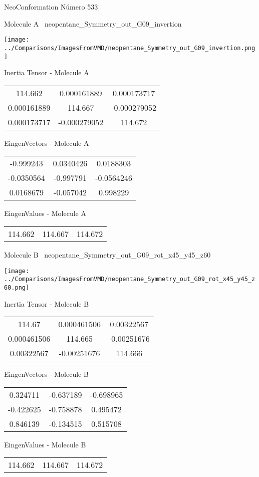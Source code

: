 \vtab[-3cm]
\begin{center}
{\large NeoConformation \tab Número 533}
\end{center}
\begin{multicols}{2}
\begin{center}

Molecule A \
neopentane\_Symmetry\_out\_G09\_invertion

\texttt{[image: ../Comparisons/ImagesFromVMD/neopentane\_Symmetry\_out\_G09\_invertion.png]}

Inertia Tensor - Molecule A \\
\begin{tabular}{|c c c|}
114.662	 & 	0.000161889	 & 	0.000173717	 \\
0.000161889	 & 	114.667	 & 	-0.000279052	 \\
0.000173717	 & 	-0.000279052	 & 	114.672
\end{tabular}

\vtab
 EingenVectors - Molecule A     \\
\begin{tabular}{|c c c|}
-0.999243	 & 	0.0340426	 & 	0.0188303	 \\
-0.0350564	 & 	-0.997791	 & 	-0.0564246	 \\
0.0168679	 & 	-0.057042	 & 	0.998229
\end{tabular}

\vtab
 EingenValues - Molecule A     \\
\begin{tabular}{|c c c|}
114.662	 & 	114.667	 & 	114.672	 \\
\end{tabular}
\columnbreak

Molecule B \
neopentane\_Symmetry\_out\_G09\_rot\_x45\_y45\_z60

\texttt{[image: ../Comparisons/ImagesFromVMD/neopentane\_Symmetry\_out\_G09\_rot\_x45\_y45\_z60.png]}

Inertia Tensor - Molecule B \\
\begin{tabular}{|c c c|}
114.67	 & 	0.000461506	 & 	0.00322567	 \\
0.000461506	 & 	114.665	 & 	-0.00251676	 \\
0.00322567	 & 	-0.00251676	 & 	114.666
\end{tabular}

\vtab
 EingenVectors - Molecule B     \\
\begin{tabular}{|c c c|}
0.324711	 & 	-0.637189	 & 	-0.698965	 \\
-0.422625	 & 	-0.758878	 & 	0.495472	 \\
0.846139	 & 	-0.134515	 & 	0.515708
\end{tabular}

\vtab
 EingenValues - Molecule B     \\
\begin{tabular}{|c c c|}
114.662	 & 	114.667	 & 	114.672	 \\
\end{tabular}

\end{center}
\end{multicols}

